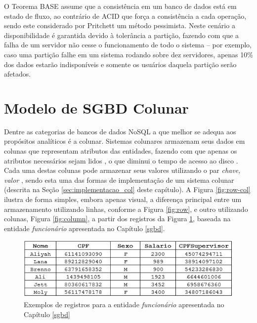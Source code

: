 O Teorema BASE assume que a consistência em um banco 
de dados está em estado de fluxo, ao contrário de ACID que força a consistência a cada operação, 
sendo este considerado por Pritchett \cite{pritchett2008base} um método pessimista. 
Neste cenário a disponibilidade é garantida devido à tolerância a partição, fazendo 
com que a falha de um servidor não cesse o funcionamento de todo o sistema -- por exemplo, caso uma partição falhe em um sistema rodando sobre dez servidores, apenas 10\% dos dados estarão indisponíveis e somente os usuários daquela partição serão afetados.


\section{Modelo de SGBD Colunar}

Dentre as categorias de bancos de dados NoSQL a que melhor se adequa aos 
propósitos analíticos é a colunar. Sistemas colunares armazenam seus dados 
em colunas que representam atributos das entidades, fazendo com que apenas os atributos necessários sejam 
lidos \cite{khoshafian1987query}, o que diminui o tempo de acesso 
ao disco \cite{matei2010column, abadi2008column}. Cada uma destas colunas pode armazenar seus valores utilizando o par 
\textit{chave, valor} \cite{abadi2013design, khoshafian1987query}, sendo esta uma das formas de implementação 
de um sistema colunar (descrita na Seção \ref{sec:implementacao_col} deste capítulo). 
A Figura \ref{fig:row-col} ilustra de forma simples, embora apenas visual, 
a diferença principal entre um armazenamento utilizando linhas, conforme a Figura \ref{fig:row}, e outro utilizando 
colunas, Figura \ref{fig:column}, a partir dos registros da Figura \ref{fig:regs}, baseada na entidade \textit{funcionário} apresentada no Capítulo \ref{sgbd}.

\begin{figure}[htpb]
	\centering
		\includegraphics[width=12cm]{registros}
	\caption{Exemplos de registros para a entidade \textit{funcionário} apresentada no Capítulo \ref{sgbd}}
	\label{fig:regs}
\end{figure}

